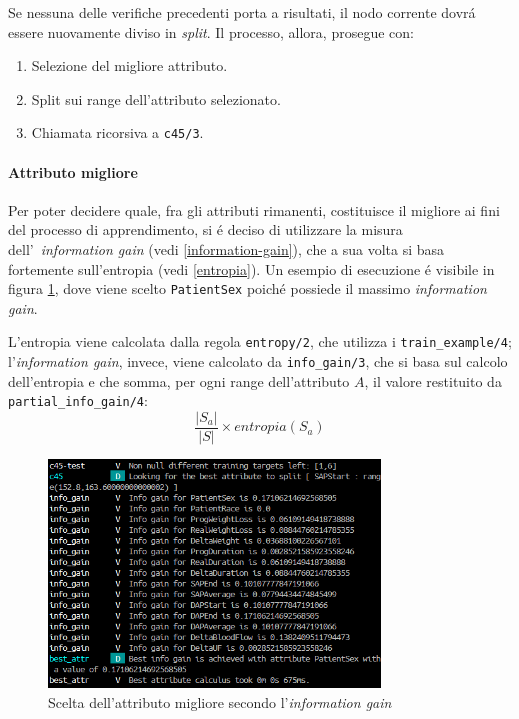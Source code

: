 \documentclass[preprint]{acm_proc_article-sp}
\begin{document}
Se nessuna delle verifiche precedenti porta a risultati, il nodo corrente dovr\'a essere nuovamente diviso in \textit{split}. Il processo, allora, prosegue con:
\begin{enumerate}
\item Selezione del migliore attributo.
\item Split sui range dell'attributo selezionato.
\item Chiamata ricorsiva a \verb|c45/3|.
\end{enumerate}

\paragraph{Attributo migliore}
\label{apprendimento-attributo-migliore}
Per poter decidere quale, fra gli attributi rimanenti, costituisce il migliore ai fini del processo di apprendimento, si \'e deciso di utilizzare la misura dell'~\textit{information gain} (vedi \ref{information-gain}), che a sua volta si basa fortemente sull'entropia (vedi \ref{entropia}). Un esempio di esecuzione \'e visibile in figura \ref{fig:prolog-best-attribute}, dove viene scelto \verb|PatientSex| poich\'e possiede il massimo \textit{information gain}.

L'entropia viene calcolata dalla regola \verb|entropy/2|, che utilizza i \verb|train_example/4|; l'\textit{information gain}, invece, viene calcolato da \verb|info_gain/3|, che si basa sul calcolo dell'entropia e che somma, per ogni range dell'attributo $A$, il valore restituito da \verb|partial_info_gain/4|:
\[\frac{|S_a|}{|S|} \times entropia(S_a)\]

\begin{figure}[!htb]
\centering
\includegraphics[width=250pt]{figures/prolog-best-attribute.png}
\caption{Scelta dell'attributo migliore secondo l'\textit{information gain}}
\label{fig:prolog-best-attribute}
\end{figure}
\end{document}
